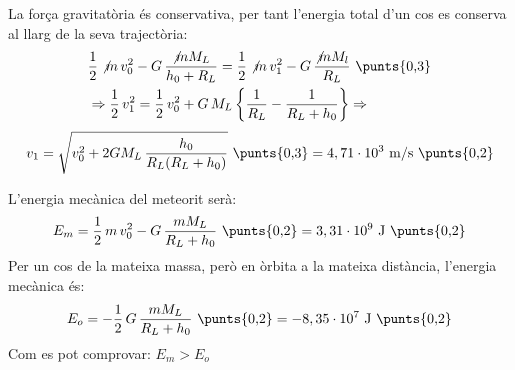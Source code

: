 \begin{solapartat}
La força gravitatòria és conservativa, per tant l'energia total d'un cos es conserva al llarg de la seva trajectòria: 
\begin{align*}
&\frac{1}{2}\not{m}\,v_0^2 - G\,\frac{\not{m}M_L}{h_0 + R_L} = \frac{1}{2}\not{m}\,v_1^2 - G\,\frac{\not{m}M_l}{R_L} \ \text{\punts{0,3}}\\
&\Rightarrow \frac{1}{2}\,v_1^2 = \frac{1}{2}\,v_0^2 + G\,M_L\left\{\frac{1}{R_L} - \frac{1}{R_L + h_0}\right\} \Rightarrow
\end{align*}
\[ v_1 = \sqrt{v_0^2 + 2GM_L\,\frac{h_0}{R_L(R_L + h_0)}} \ \text{\punts{0,3}} = 4,71\cdot 10^{3}\ \mathrm{m/s} \ \text{\punts{0,2}} \]
\end{solapartat}

\begin{solapartat}
L'energia mecànica del meteorit serà:
\[ E_m = \frac{1}{2}\,m\,v_0^2 - G\,\frac{mM_L}{R_L + h_0} \ \text{\punts{0,2}} = 3,31\cdot 10^{9}\ \mathrm{J} \ \text{\punts{0,2}} \]
Per un cos de la mateixa massa, però en òrbita a la mateixa distància, l'energia mecànica és:
\[ E_o = -\frac{1}{2}\,G\,\frac{mM_L}{R_L + h_0} \ \text{\punts{0,2}} = -8,35\cdot 10^{7}\ \mathrm{J} \ \text{\punts{0,2}} \]
Com es pot comprovar: $E_m > E_o$ 
\end{solapartat}
